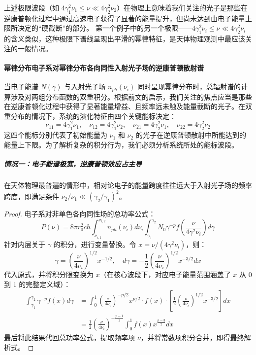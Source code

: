 上述极限波段（如 $4\gamma_1^2 \nu_1 \le \nu \ll 4\gamma_2^2 \nu_2$）在物理上意味着我们关注的光子是那些在逆康普顿化过程中通过高速电子获得了显著的能量提升，但尚未达到由电子能量上限所决定的“硬截断”的部分。
第一个例子中的另一个极限——$4\gamma_1^2 \nu_i\leq \nu \ll 4\gamma_2^2\nu_i$的含义类似，这种极限下谱线呈现出平滑的幂律特征，是天体物理观测中最应该关注的一般情况。

\paragraph{幂律分布电子系对幂律分布各向同性入射光子场的逆康普顿散射谱} 
当电子能谱 $N(\gamma)$ 与入射光子场 $n_{ph}(\nu_i)$ 同时呈现幂律分布时，总辐射谱的计算涉及对两组分布函数的双重积分。根据前文的启示，我们关注的焦点应当是那些在逆康普顿化过程中获得了显著能量增益、且频率远未触及能量截断的光子。在双重分布的情况下，系统的演化特征由四个关键能标决定：
\begin{equation}
    \nu_{11} = 4\gamma_1^2\nu_1, \quad \nu_{12} = 4\gamma_1^2\nu_2, \quad \nu_{21} = 4\gamma_2^2\nu_1, \quad \nu_{22} = 4\gamma_2^2\nu_2
\end{equation}
这四个能标分别代表了初始能量为 $\nu_1$ 和 $\nu_2$ 的光子在逆康普顿散射中所能达到的能量上下限。为了解析复杂的积分行为，我们必须分析系统所处的能标波段。

\subparagraph{情况一：电子能谱极宽，逆康普顿效应占主导}

在天体物理最普遍的情形中，相对论电子的能量跨度往往远大于入射光子场的频率跨度，即满足条件 $\nu_2/\nu_1 \ll (\gamma_2/\gamma_1)^2$。
\begin{proof}
电子系对非单色各向同性场的总功率公式：
\begin{equation}
    P(\nu) = 8\pi r_0^2 ch \int_{\nu_{i,1}}^{\nu_{i,2}} n_{ph}(\nu_i) d\nu_i \int_{\gamma_1}^{\gamma_2} N_0 \gamma^{-p} f\left( \frac{\nu}{4\gamma^2 \nu_i} \right) d\gamma
\end{equation}
针对内层关于 $\gamma$ 的积分，进行变量替换。令 $x = \nu / (4\gamma^2 \nu_i)$，则：
\begin{equation}
    \gamma = \left( \frac{\nu}{4\nu_i} \right)^{1/2} x^{-1/2}, \quad d\gamma = -\frac{1}{2} \left( \frac{\nu}{4\nu_i} \right)^{1/2} x^{-3/2} dx
\end{equation}
代入原式，并将积分限变换为 $x$（在核心波段下，对应电子能量范围涵盖了 $x$ 从 $0$ 到 $1$ 的完整定义域）：
\begin{equation}
    \begin{aligned}
        \int_{\gamma_1}^{\gamma_2} \gamma^{-p} f(x) d\gamma &= \int_0^1 \left( \frac{\nu}{4\nu_i} \right)^{-p/2} x^{p/2} \cdot f(x) \cdot \left[ \frac{1}{2} \left( \frac{\nu}{4\nu_i} \right)^{1/2} x^{-3/2} \right] dx \\
        &= \frac{1}{2} \left( \frac{\nu}{4\nu_i} \right)^{-\frac{p-1}{2}} \int_0^1 f(x) x^{\frac{p-3}{2}} dx
    \end{aligned}
\end{equation}
最后将此结果代回总功率公式，提取频率项 $\nu$，并将常数项积分合并，即得最终解析式。
\end{proof}

